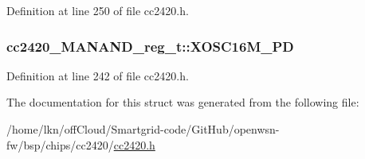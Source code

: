 Definition at line 250 of file cc2420.\+h.

\subsubsection[{\texorpdfstring{X\+O\+S\+C16\+M\+\_\+\+PD}{XOSC16M_PD}}]{ cc2420\+\_\+\+M\+A\+N\+A\+N\+D\+\_\+reg\+\_\+t\+::\+X\+O\+S\+C16\+M\+\_\+\+PD}\hypertarget{structcc2420___m_a_n_a_n_d__reg__t_a59782ff31c795916a56bba1f4b30243f}{}\label{structcc2420___m_a_n_a_n_d__reg__t_a59782ff31c795916a56bba1f4b30243f}


Definition at line 242 of file cc2420.\+h.



The documentation for this struct was generated from the following file\+:\begin{DoxyCompactItemize}
\item 
/home/lkn/off\+Cloud/\+Smartgrid-\/code/\+Git\+Hub/openwsn-\/fw/bsp/chips/cc2420/\hyperlink{cc2420_8h}{cc2420.\+h}\end{DoxyCompactItemize}
